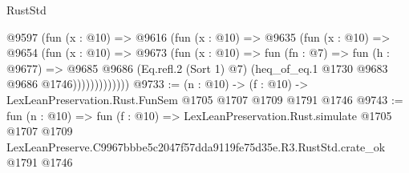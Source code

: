 \begin{lexlean}{RustStd}
\begin{coremodule}
                @9597
                  (fun (x : @10) =>
                  @9616
                    (fun (x : @10) =>
                    @9635
                      (fun (x : @10) =>
                      @9654
                        (fun (x : @10) =>
                        @9673
                          (fun (x : @10) =>
                          fun (fn : @7) =>
                          fun (h : @9677) =>
                          @9685
                            @9686
                            (Eq.refl.{2} (Sort 1) @7)
                            (heq_of_eq.{1} @1730 @9683 @9686 @1746)))))))))))))
@9733 := (n : @10) -> (f : @10) -> LexLeanPreservation.Rust.FunSem @1705 @1707 @1709 @1791 @1746
@9743 := fun (n : @10) =>
  fun (f : @10) =>
  LexLeanPreservation.Rust.simulate
    @1705
    @1707
    @1709
    LexLeanPreserve.C9967bbbe5c2047f57dda9119fe75d35e.R3.RustStd.crate_ok
    @1791
    @1746
\end{coremodule}
\end{lexlean}
